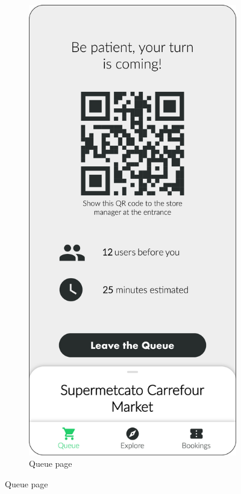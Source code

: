 \begin{figure}[H]
\begin{subfigure}[t]{0.28\textwidth}
    \end{subfigure}
    \quad
    \begin{subfigure}[t]{0.28\textwidth} 
        \includegraphics{../mockups/queue}
        \caption*{Queue page}
    \end{subfigure}
\end{figure}

